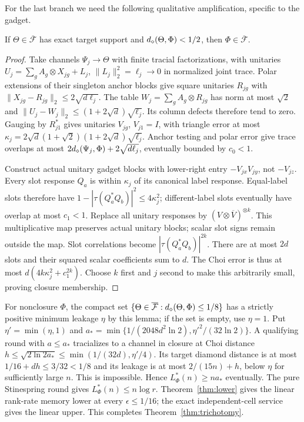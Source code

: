 For the last branch we need the following qualitative amplification, specific to the gadget.
\begin{lemma}\label{lem:support-amplification}
If $\Theta\in\overline{\mathcal F}$ has exact target support and $d_\diamond(\Theta,\Phi)<1/2$, then
$\Phi\in\overline{\mathcal F}$.
\end{lemma}
\begin{proof}
Take channels $\Psi_j\to\Theta$ with finite tracial factorizations, with unitaries $U_j=\sum_gA_g\otimes X_{jg}+L_j$,
$\|L_j\|_2^2=\ell_j\to0$ in normalized joint trace. Polar extensions of their singleton anchor blocks
give square unitaries $R_{jg}$ with
$\|X_{jg}-R_{jg}\|_2\le2\sqrt{d\ell_j}$.
The table $W_j=\sum_gA_g\otimes R_{jg}$ has norm at most $\sqrt2$ and
$\|U_j-W_j\|_2\le(1+2\sqrt d)\sqrt{\ell_j}$.
Its column defects therefore tend to zero. Gauging by $R_{j1}^*$ gives unitaries $V_{jg}$,
$V_{j1}=I$, with triangle error at most
$\kappa_j=2\sqrt d(1+\sqrt2)(1+2\sqrt d)\sqrt{\ell_j}$.
Anchor testing and polar error give trace overlaps at most
$2d_\diamond(\Psi_j,\Phi)+2\sqrt{d\ell_j}$, eventually bounded by $c_0<1$.

Construct actual unitary gadget blocks with lower-right entry $-V_{jx}V_{jy}$, not $-V_{jz}$.
Every slot response $Q_a$ is within $\kappa_j$ of its canonical label response. Equal-label slots therefore
have $1-|\tau(Q_a^*Q_b)|^2\le4\kappa_j^2$; different-label slots eventually have overlap at most $c_1<1$.
Replace all unitary responses by $(V\otimes\overline V)^{\otimes k}$.
This multiplicative map preserves actual unitary blocks; scalar slot signs remain outside the map.
Slot correlations become $|\tau(Q_a^*Q_b)|^{2k}$.
There are at most $2d$ slots and their squared scalar coefficients sum to $d$.
The Choi error is thus at most $d(4k\kappa_j^2+c_1^{2k})$.
Choose $k$ first and $j$ second to make this arbitrarily small, proving closure membership.
\end{proof}

For nonclosure $\Phi$, the compact set
$\{\Theta\in\overline{\mathcal F}:d_\diamond(\Theta,\Phi)\le1/8\}$ has a strictly positive minimum leakage
$\eta$ by this lemma; if the set is empty, use $\eta=1$.
Put $\eta'=\min(\eta,1)$ and
$a_* =\min\{1/(2048d^2\ln2),\eta'^2/(32\ln2)\}$.
A qualifying round with $a\le a_*$ tracializes to a channel in closure at Choi distance
$h\le\sqrt{2\ln2 a_*}\le\min(1/(32d),\eta'/4)$.
Its target diamond distance is at most $1/16+dh\le3/32<1/8$ and its leakage is at most $2/(15n)+h$,
below $\eta$ for sufficiently large $n$. This is impossible. Hence
$L^*_\Phi(n)\ge na_*$ eventually. The pure Stinespring round gives $L^*_\Phi(n)\le n\log r$.
Theorem~\ref{thm:lower} gives the linear rank-rate memory lower at every $\epsilon\le1/16$;
the exact independent-cell service gives the linear upper. This completes Theorem~\ref{thm:trichotomy}.

